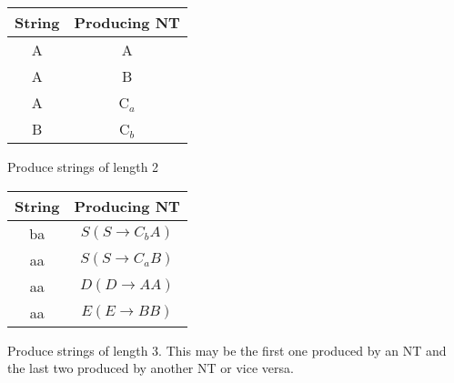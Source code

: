 \documentclass[a4,9pt]{beamer}
\begin{document}
\begin{frame}

\begin{center}
\begin{tabular}{cc}
\hline

\hline

\hline

\hline
String & Producing NT \\
\hline
A & A \\
A & B \\
A & C$_{a}$ \\
B & C$_{b}$ \\
\hline

\hline

\hline

\hline

\end{tabular}
\end{center}

\vspace*{0.1cm}
\hspace*{0.4cm}Produce strings of length 2\\
\vspace*{0.1cm}

\begin{center}
\begin{tabular}{cc}
\hline

\hline

\hline

\hline
String & Producing NT \\
\hline
ba  & $S (S \rightarrow C_{b}A)$ \\
aa  & $S (S \rightarrow C_{a}B)$ \\
aa  & $D (D \rightarrow AA)$ \\
aa  & $E (E \rightarrow BB)$ \\
\hline

\hline

\hline

\hline

\end{tabular}
\end{center}
\vspace*{0.1cm}

\hspace*{0.4cm} Produce strings of length 3. This may be the first one produced by an NT and the last two produced
by another NT or vice versa.\\

\vspace*{0.1cm}
\end{frame}
\end{document}
